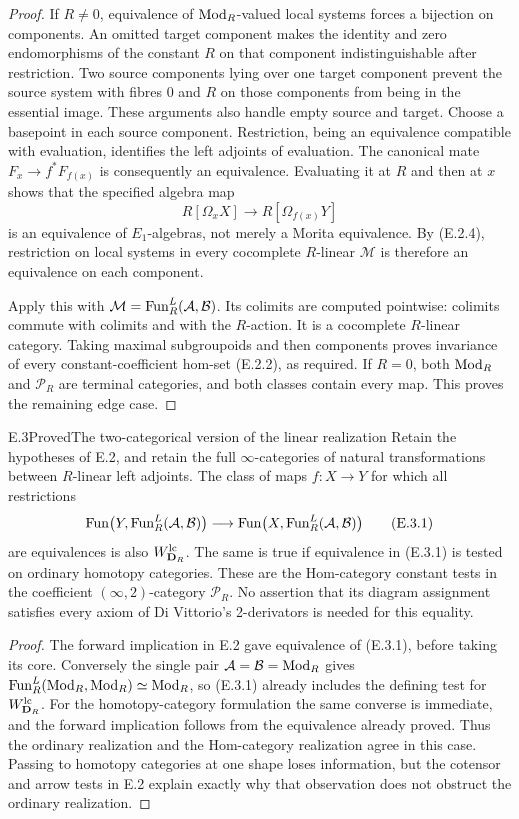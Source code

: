 \begin{proof}
If $R\ne0$, equivalence of $\operatorname{Mod}_R$-valued local systems forces a
bijection on components.  An omitted target component makes the
identity and zero endomorphisms of the constant $R$ on that component
indistinguishable after restriction.  Two source components lying over
one target component prevent the source system with fibres $0$ and $R$
on those components from being in the essential image.  These arguments
also handle empty source and target.
Choose a basepoint in each source component.  Restriction, being an
equivalence compatible with evaluation, identifies the left adjoints of
evaluation.  The canonical mate
$F_x\to f^*F_{f(x)}$ is consequently an equivalence.  Evaluating it at
$R$ and then at $x$ shows that the specified algebra map
\[
 R[\Omega_xX]\longrightarrow R[\Omega_{f(x)}Y]                 \tag{E.2.5}
\]
is an equivalence of $E_1$-algebras, not merely a Morita equivalence.
By (E.2.4), restriction on local systems in every cocomplete $R$-linear
$\mathcal M$ is therefore an equivalence on each component.

Apply this with $\mathcal M=\operatorname{Fun}_R^L(\mathcal A,\mathcal B)$.
Its colimits are computed pointwise: colimits commute with colimits and
with the $R$-action.  It is a cocomplete $R$-linear category.  Taking
maximal subgroupoids and then components proves invariance of every
constant-coefficient hom-set (E.2.2), as required.  If $R=0$, both
$\operatorname{Mod}_R$ and $\mathcal P_R$ are terminal categories, and both classes
contain every map.  This proves the remaining edge case.
\end{proof}

\begin{claim}{E.3}{Proved}{The two-categorical version of the linear realization}
Retain the hypotheses of E.2, and retain the full $\infty$-categories of
natural transformations between $R$-linear left adjoints.  The class
of maps $f:X\to Y$ for which all restrictions
\[
 \operatorname{Fun}\bigl(Y,\operatorname{Fun}_R^L(\mathcal A,\mathcal B)\bigr)
 \longrightarrow
 \operatorname{Fun}\bigl(X,\operatorname{Fun}_R^L(\mathcal A,\mathcal B)\bigr)               \tag{E.3.1}
\]
are equivalences is also $W_{\mathbf D_R}^{\mathrm{lc}}$.  The same is true
if equivalence in (E.3.1) is tested on ordinary homotopy categories.
These are the Hom-category constant tests in the coefficient
$(\infty,2)$-category $\mathcal P_R$.  No assertion that its diagram
assignment satisfies every axiom of Di Vittorio's 2-derivators is
needed for this equality.
\end{claim}
\begin{proof}
The forward implication in E.2 gave equivalence of (E.3.1), before
taking its core.  Conversely the single pair
$\mathcal A=\mathcal B=\operatorname{Mod}_R$ gives
$\operatorname{Fun}_R^L(\operatorname{Mod}_R,\operatorname{Mod}_R)\simeq\operatorname{Mod}_R$, so (E.3.1) already includes
the defining test for $W_{\mathbf D_R}^{\mathrm{lc}}$.
For the homotopy-category formulation the same converse is immediate,
and the forward implication follows from the equivalence already
proved.  Thus the ordinary realization and the Hom-category
realization agree in this case.  Passing to homotopy categories at one
shape loses information, but the cotensor and arrow tests in E.2
explain exactly why that observation does not obstruct the ordinary
realization.
\end{proof}

